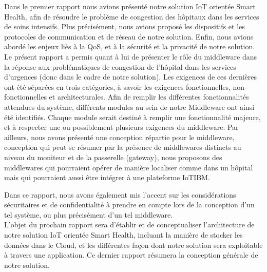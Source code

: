 Dans le premier rapport nous avions présenté notre solution IoT orientée Smart Health, afin de résoudre le problème de congestion des hôpitaux dans les services de soins intensifs. Plus précisément, nous avions proposé les dispositifs et les protocoles de communication et de réseau de notre solution. Enfin, nous avions abordé les enjeux liès à la QoS, et à la sécurité et la privacité de notre solution.
\\

Le présent rapport a permis quant à lui de présenter le rôle du middleware dans la réponse aux problématiques de congestion de l'hôpital dans les services d'urgences (donc dans le cadre de notre solution). Les exigences de ces dernières ont été séparées en trois catégories, à savoir les exigences fonctionnelles, non-fonctionnelles et architecturales. Afin de remplir les différentes fonctionnalités attendues du système, différents modules au sein de notre Middleware ont ainsi été identifiés. Chaque module serait destiné à remplir une fonctionnalité majeure, et à respecter une ou possiblement plusieurs exigences du middleware. Par ailleurs, nous avons présenté une conception répartie pour le middleware, conception qui peut se résumer par la présence de middlewares distincts au niveau du moniteur et de la passerelle (gateway), nous proposons des middlewares qui pourraient opérer de manière localiser comme dans un hôpital mais qui pourraient aussi être intégrer à une plateforme IoT{IBM}.

Dans ce rapport, nous avons également mis l'accent sur les considérations sécuritaires et de confidentialité à prendre en compte lors de la conception d'un tel système, ou plus précisément d'un tel middleware.
\\

L'objet du prochain rapport sera d'établir et de conceptualiser l'architecture de notre solution IoT orientée Smart Health, incluant la manière de stocker les données dans le Cloud, et les différentes façon dont notre solution sera exploitable à travers une application. Ce dernier rapport résumera la conception générale de notre solution.
